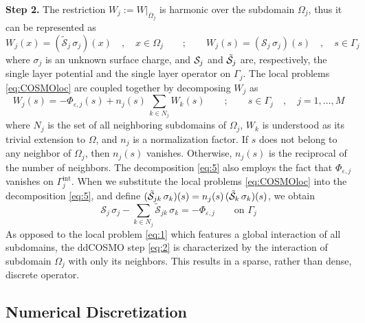 {\bf Step 2.} The restriction $W_j := W |_{\overline{\Omega}_j}$ is harmonic over the subdomain $\Omega_j$, thus it can be represented as 
\begin{equation}\label{eq:COSMOloc}
W_j(x) = (\tilde{\mathcal{S}}_j \,  \sigma_j) (x) \quad , \quad x \in \Omega_j \qquad ; \qquad
W_j(s) = (\mathcal{S}_j \,  \sigma_j) (s) \quad , \quad s \in \Gamma_j
\end{equation}
where $\sigma_j$ is an unknown surface charge, and $\mathcal{S}_j$ and $\tilde{\mathcal{S}}_j$ are, respectively, the single layer potential and the single layer operator on $\Gamma_j$. The local problems \eqref{eq:COSMOloc} are coupled together by decomposing $W_j$ as
\begin{equation}\label{eq:5}
W_j(s) = - \Phi_{\varepsilon,j}(s) +  n_j(s) \, \sum_{k \in N_j} {W}_k(s) \qquad ; \qquad s \in \Gamma_j \quad , \quad j = 1, \ldots , M
\end{equation}
where $N_j$ is the set of all neighboring subdomains of $\Omega_j$, $W_k$ is understood as its trivial extension to $\Omega$, and $n_j$ is a normalization factor. If $s$ does not belong to any neighbor of $\Omega_j$, then $n_j(s)$ vanishes. Otherwise, $n_j(s)$ is the reciprocal of the number of neighbors. The decomposition \eqref{eq:5} also employs the fact that $\Phi_{\varepsilon,j}$ vanishes on $\Gamma_j^\text{int}$. When we substitute the local problems \eqref{eq:COSMOloc} into the decomposition \eqref{eq:5}, and define $(\tilde{\mathcal{S}}_{jk} \, \sigma_k) (s) = n_j(s) \, (\tilde{\mathcal{S}}_k \, \sigma_k)(s)$, we obtain
\begin{equation}\label{eq:2}
\mathcal{S}_j \, \sigma_j  -  \sum_{k \in N_j} \tilde{\mathcal{S}}_{jk} \, \sigma_k = -  \Phi_{\varepsilon,j} \qquad \text{on } \Gamma_j
\end{equation}
As opposed to the local problem \eqref{eq:1} which features a global interaction of all subdomains, the ddCOSMO step \eqref{eq:2} is characterized by the interaction of subdomain $\Omega_j$ with only its neighbors. This results in a sparse, rather than dense, discrete operator.

\subsection{Numerical Discretization}

